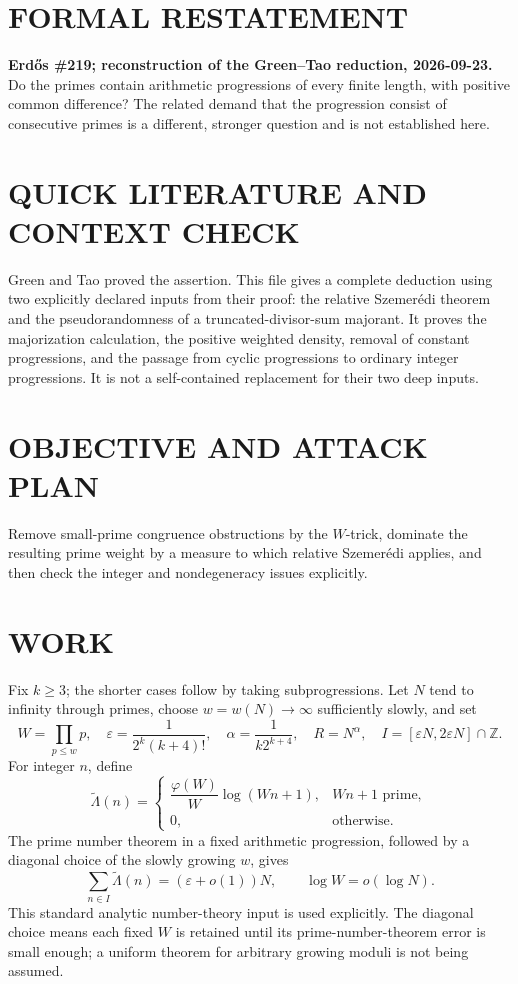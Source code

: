 \section{FORMAL RESTATEMENT}
\textbf{Erd\H{o}s \#219; reconstruction of the Green--Tao reduction, 2026-09-23.}
Do the primes contain arithmetic progressions of every finite length, with positive common difference? The related demand that the progression consist of consecutive primes is a different, stronger question and is not established here.

\section{QUICK LITERATURE AND CONTEXT CHECK}
Green and Tao proved the assertion. This file gives a complete deduction using two explicitly declared inputs from their proof: the relative Szemer\'edi theorem and the pseudorandomness of a truncated-divisor-sum majorant. It proves the majorization calculation, the positive weighted density, removal of constant progressions, and the passage from cyclic progressions to ordinary integer progressions. It is not a self-contained replacement for their two deep inputs.

\section{OBJECTIVE AND ATTACK PLAN}
Remove small-prime congruence obstructions by the $W$-trick, dominate the resulting prime weight by a measure to which relative Szemer\'edi applies, and then check the integer and nondegeneracy issues explicitly.

\section{WORK}
Fix $k\geq3$; the shorter cases follow by taking subprogressions. Let $N$ tend to infinity through primes, choose $w=w(N)\to\infty$ sufficiently slowly, and set
\[
W=\prod_{p\leq w}p,\quad
\varepsilon=\frac1{2^k(k+4)!},\quad
\alpha=\frac1{k2^{k+4}},\quad R=N^\alpha,
\quad I=[\varepsilon N,2\varepsilon N]\cap\mathbb Z.
\]
For integer $n$, define
\[
\widetilde\Lambda(n)=
\begin{cases}
\dfrac{\varphi(W)}W\log(Wn+1),&Wn+1\text{ prime},\\
0,&\text{otherwise}.
\end{cases}
\tag{1}
\]
The prime number theorem in a fixed arithmetic progression, followed by a diagonal choice of the slowly growing $w$, gives
\[
\sum_{n\in I}\widetilde\Lambda(n)=(\varepsilon+o(1))N,
\qquad \log W=o(\log N).
\tag{2}
\]
This standard analytic number-theory input is used explicitly. The diagonal choice means each fixed $W$ is retained until its prime-number-theorem error is small enough; a uniform theorem for arbitrary growing moduli is not being assumed.


